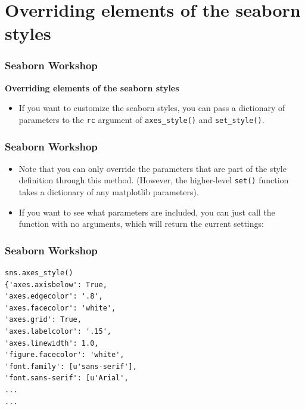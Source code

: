 \documentclass{beamer}
\begin{document}
\section{Overriding elements of the seaborn styles}
\begin{frame}[fragile]
	\frametitle{Seaborn Workshop}
	\large
\noindent \textbf{Overriding elements of the seaborn styles}\\
\begin{itemize}
\item If you want to customize the seaborn styles, you can pass a dictionary of parameters to the \texttt{rc} argument of \texttt{axes\_style()} and \texttt{set\_style()}. 
\end{itemize}

\end{frame}
\begin{frame}[fragile]
	\frametitle{Seaborn Workshop}
	\large
\begin{itemize}
\item Note that you can only override the parameters that are part of the style definition through this method. (However, the higher-level \texttt{set()} function takes a dictionary of any matplotlib parameters).
\item 
If you want to see what parameters are included, you can just call the function with no arguments, which will return the current settings:
\end{itemize}
\end{frame}
\begin{frame}[fragile]
	\frametitle{Seaborn Workshop}
	\large
\begin{verbatim}
sns.axes_style()
{'axes.axisbelow': True,
'axes.edgecolor': '.8',
'axes.facecolor': 'white',
'axes.grid': True,
'axes.labelcolor': '.15',
'axes.linewidth': 1.0,
'figure.facecolor': 'white',
'font.family': [u'sans-serif'],
'font.sans-serif': [u'Arial',
...
...
\end{verbatim}

\end{frame}
\end{document}
